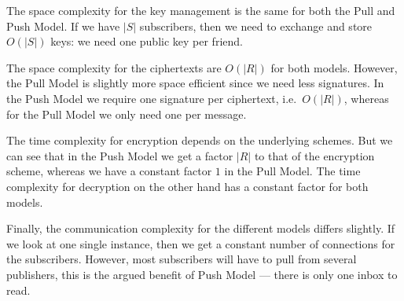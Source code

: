 The space complexity for the key management is the same for both the Pull and 
Push Model.
If we have \(|S|\) subscribers, then we need to exchange and store \(O(|S|)\) 
keys:
we need one public key per friend.

The space complexity for the ciphertexts are \(O(|R|)\) for both models.
However, the Pull Model is slightly more space efficient since we need less 
signatures.
In the Push Model we require one signature per ciphertext, i.e.\ \(O(|R|)\), 
whereas for the Pull Model we only need one per message.

The time complexity for encryption depends on the underlying schemes.
But we can see that in the Push Model we get a factor \(|R|\) to that of the 
encryption scheme, whereas we have a constant factor \(1\) in the Pull 
Model.
The time complexity for decryption on the other hand has a constant factor for 
both models.

Finally, the communication complexity for the different models differs 
slightly.
If we look at one single instance, then we get a constant number of connections
for the subscribers.
However, most subscribers will have to pull from several publishers, this is 
the argued benefit of Push Model --- there is only one inbox to read.

%



